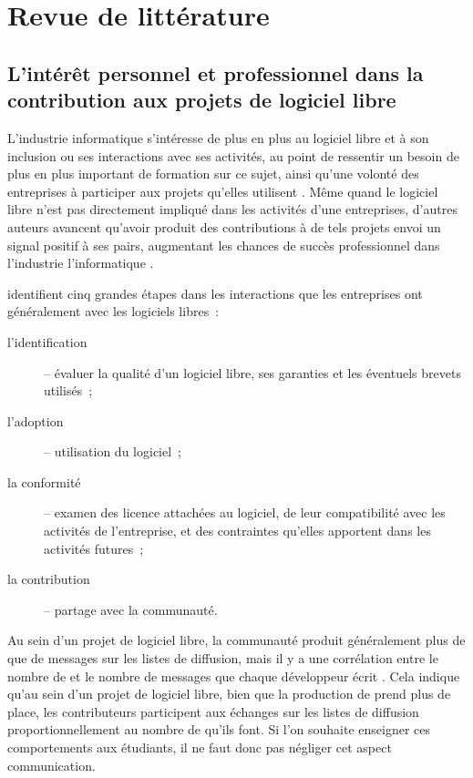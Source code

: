 \chapter{Revue de littérature}

\section{L'intérêt personnel et professionnel dans la contribution aux projets de logiciel libre}

L'industrie informatique s'intéresse de plus en plus au logiciel libre et à son inclusion ou ses interactions
avec ses activités, au point de ressentir un besoin de plus en plus important de formation sur ce sujet, ainsi
qu'une volonté des entreprises à participer aux projets qu'elles utilisent .
Même quand le logiciel libre n'est pas directement impliqué dans les activités d'une entreprises, d'autres
auteurs avancent qu'avoir produit des contributions à de tels projets envoi un signal positif à ses pairs,
augmentant les chances de succès professionnel dans l'industrie l'informatique
.

\textcite{strategies-2012} identifient cinq grandes étapes dans les interactions que les entreprises ont
généralement avec les logiciels libres :
\begin{description}
    \item[l'identification] -- évaluer la qualité d'un logiciel libre, ses garanties et les éventuels brevets
        utilisés ;
    \item[l'adoption] -- utilisation du logiciel ;
    \item[la conformité] -- examen des licence attachées au logiciel, de leur compatibilité avec les activités
        de l'entreprise, et des contraintes qu'elles apportent dans les activités futures ;
    \item[la contribution] -- partage avec la communauté.
\end{description}

Au sein d'un projet de logiciel libre, la communauté produit généralement plus de  que de
messages sur les listes de diffusion, mais il y a une corrélation entre le nombre de  et le
nombre de messages que chaque développeur écrit . Cela indique qu'au
sein d'un projet de logiciel libre, bien que la production de  prend plus de place, les
contributeurs participent aux échanges sur les listes de diffusion proportionnellement au nombre de
 qu'ils font. Si l'on souhaite enseigner ces comportements aux étudiants, il ne faut donc pas
négliger cet aspect communication.

